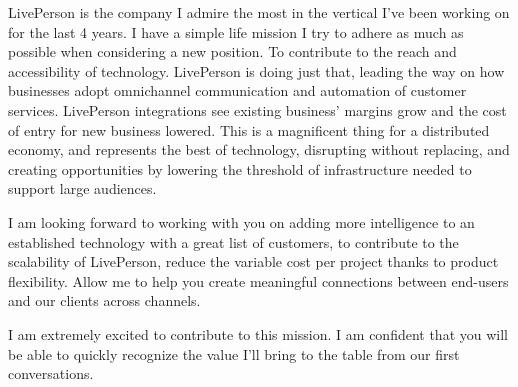 LivePerson is the company I admire the most in the vertical I've been working on for the last 4 years. I have a simple life mission I try to adhere as much as possible when considering a new position. To contribute to the reach and accessibility of technology. LivePerson is doing just that, leading the way on how businesses adopt omnichannel communication and automation of customer services. LivePerson integrations see existing business' margins grow and the cost of entry for new business lowered. This is a magnificent thing for a distributed economy, and represents the best of technology, disrupting without replacing, and creating opportunities by lowering the threshold of infrastructure needed to support large audiences.

I am looking forward to working with you on adding more intelligence to an established technology with a great list of customers, to contribute to the scalability of LivePerson, reduce the variable cost per project thanks to product flexibility. Allow me to help you create meaningful connections between end-users and our clients across channels.

I am extremely excited to contribute to this mission. I am confident that you will be able to quickly recognize the value I'll bring to the table from our first conversations.